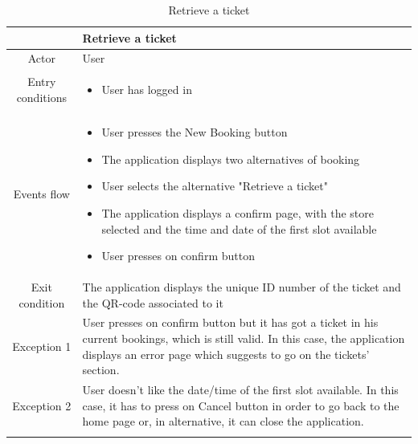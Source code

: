 \documentclass[table, 12pt]{article}
\begin{document}
\begin{longtable}{|c| p{10cm}|}
    \hline
                     & Retrieve a ticket                                                                                                                                                                                        \\
    \hline
    Actor            & User                                                                                                                                                                                                     \\
    \hline
    Entry conditions & \begin{itemize}
        \item User has logged in
    \end{itemize}                                                                                                                                                                               \\
    \hline
    Events flow      & \begin{itemize}[nosep,after=\strut]
        \item User presses the New Booking button
        \item The application displays two alternatives of booking
        \item User selects the alternative "Retrieve a ticket"
        \item The application displays a confirm page, with the store selected and the time and date of the first slot available
        \item User presses on confirm button
    \end{itemize}                                                                                                                                                                               \\
    \hline
    Exit condition   &
    The application displays the unique ID number of the ticket and the QR-code associated to it                                                                                                                                \\
    \hline
    \hline
    Exception 1      & User presses on confirm button but it has got a ticket in his current bookings, which is still valid. In this case, the application displays an error page which suggests to go on the tickets' section. \\
    \hline
    Exception 2      & User doesn't like the date/time of the first slot available. In this case, it has to press on Cancel button in order to go back to the home page or, in alternative, it can close the application.       \\
    \hline
    \caption{Retrieve a ticket}                                                                                                                                                                                                 \\
\end{longtable}
\end{document}
